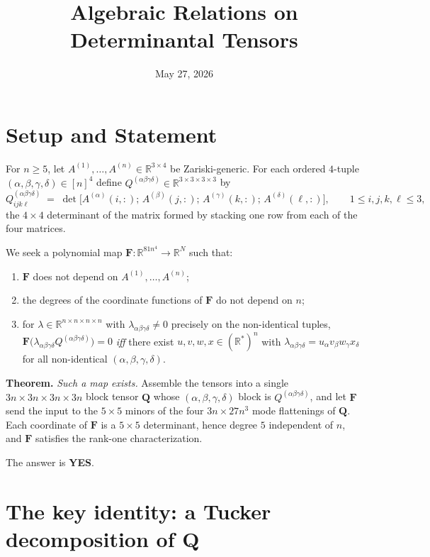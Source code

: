 \documentclass[11pt]{article}
\title{Algebraic Relations on Determinantal Tensors}
\author{}
\date{May 27, 2026}
\newcommand{\R}{\mathbb{R}}
\newcommand{\bQ}{\mathbf{Q}}
\newcommand{\bF}{\mathbf{F}}
\begin{document}
\maketitle

\section*{Setup and Statement}

For $n\ge 5$, let $A^{(1)},\dots,A^{(n)}\in\R^{3\times4}$ be Zariski-generic.
For each ordered $4$-tuple $(\alpha,\beta,\gamma,\delta)\in[n]^4$ define
$Q^{(\alpha\beta\gamma\delta)}\in\R^{3\times3\times3\times3}$ by
\[
  Q^{(\alpha\beta\gamma\delta)}_{ijk\ell}
   \;=\; \det\!\bigl[A^{(\alpha)}(i,:);\,A^{(\beta)}(j,:);\,A^{(\gamma)}(k,:);\,A^{(\delta)}(\ell,:)\bigr],
   \qquad 1\le i,j,k,\ell\le 3,
\]
the $4\times4$ determinant of the matrix formed by stacking one row from each
of the four matrices.

We seek a polynomial map $\bF:\R^{81n^4}\to\R^{N}$ such that:
\begin{enumerate}\setlength\itemsep{2pt}
\item $\bF$ does not depend on $A^{(1)},\dots,A^{(n)}$;
\item the degrees of the coordinate functions of $\bF$ do not depend on $n$;
\item for $\lambda\in\R^{n\times n\times n\times n}$ with $\lambda_{\alpha\beta\gamma\delta}\ne0$
      precisely on the non-identical tuples,
      $\bF\bigl(\lambda_{\alpha\beta\gamma\delta}Q^{(\alpha\beta\gamma\delta)}\bigr)=0$
      \emph{iff} there exist $u,v,w,x\in(\R^{*})^n$ with
      $\lambda_{\alpha\beta\gamma\delta}=u_\alpha v_\beta w_\gamma x_\delta$ for
      all non-identical $(\alpha,\beta,\gamma,\delta)$.
\end{enumerate}

\medskip
\noindent\textbf{Theorem.} \emph{Such a map exists.} Assemble the tensors into
a single $3n\times3n\times3n\times3n$ block tensor $\bQ$ whose
$(\alpha,\beta,\gamma,\delta)$ block is $Q^{(\alpha\beta\gamma\delta)}$, and let
$\bF$ send the input to the $5\times5$ minors of the four
$3n\times27n^{3}$ mode flattenings of $\bQ$. Each coordinate of $\bF$ is a
$5\times5$ determinant, hence degree $5$ independent of $n$, and $\bF$
satisfies the rank-one characterization.

\medskip
\noindent The answer is \textbf{YES}.

\section*{The key identity: a Tucker decomposition of \texorpdfstring{$\bQ$}{Q}}
\end{document}
